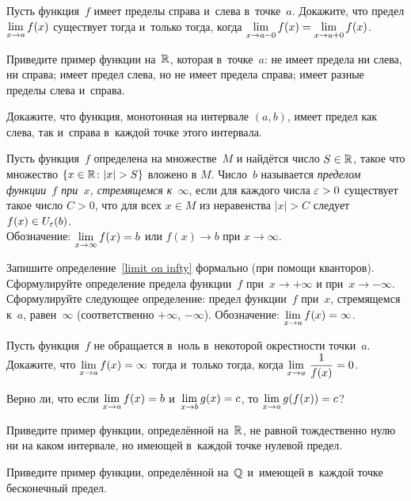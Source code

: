 \documentclass[a4paper,12pt]{article}
\begin{document}
Пусть функция~$f$ имеет пределы справа и~слева в~точке~$a$. Докажите, что предел $\lim\limits_{x \rightarrow a} f(x)$ существует тогда и~только тогда, когда $\lim\limits_{x \rightarrow a-0} f(x) = \lim\limits_{x \rightarrow a+0} f(x)$.

Приведите пример функции на~$\mathbb{R}$, которая в~точке~$a$:
не имеет предела ни слева, ни справа;
имеет предел слева, но не имеет предела справа;
имеет разные пределы слева и~справа.

Докажите, что функция, монотонная на интервале $(a,b)$, имеет предел как слева, так и~справа в~каждой точке этого интервала.

\label{limit on infty}
Пусть функция~$f$ определена на
множестве~$M$
и найдётся число $S \in \mathbb{R}$, такое что множество $\{x \in \mathbb{R} \colon |x| > S\}$ вложено в $M$.
Число~$b$ называется \emph{пределом функции~$f$ при~$x$, стремящемся к~$\infty$}, если для каждого числа $\varepsilon > 0$ существует такое число $C>0$, что для всех $x\in M$ из неравенства $|x| > C$ следует $f(x) \in U_\varepsilon(b)$.\\
Обозначение: $\lim\limits_{x \rightarrow \infty} f(x)=b$ или $f(x)\to b$ при $x\to \infty$.

Запишите определение~\ref{limit on infty} формально (при помощи кванторов).\\
Сформулируйте определение предела функции~$f$ при~$x \to +\infty$ и при~$x \to -\infty$.\\
Сформулируйте следующее определение: предел функции~$f$ при~$x$, стремящемся к~$a$, равен~$\infty$ (соответственно $+\infty$, $-\infty$).
\qquad Обозначение: $\lim\limits_{x \rightarrow a}f(x) = \infty$.

Пусть функция~$f$ не обращается в~ноль в~некоторой окрестности точки~$a$.  Докажите, что $\lim\limits_{x \rightarrow a}f(x) = \infty$ тогда и~только тогда, когда $\lim\limits_{x \rightarrow a}\,\dfrac{1}{f(x)}=0$.

Верно ли, что если $\lim\limits_{x \rightarrow a} f(x) = b$ и~$\lim\limits_{x \rightarrow b} g(x) = c$, то $\lim\limits_{x \rightarrow a} g(f(x)) = c$?

Приведите пример функции, определённой на~$\mathbb{R}$, не равной тождественно нулю ни на каком интервале, но имеющей в~каждой точке нулевой предел.

Приведите пример функции, определённой на~$\mathbb{Q}$ и~имеющей в~каждой точке бесконечный предел.







\vfill
{}
\end{document}
